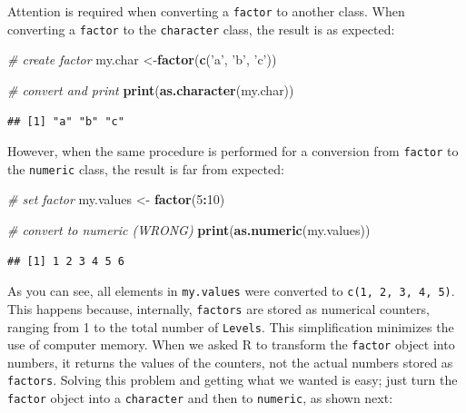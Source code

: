 \documentclass[11pt,]{book}
\newenvironment{Shaded}{\begin{snugshade}}{\end{snugshade}}
\newcommand{\KeywordTok}[1]{\textcolor[rgb]{0.27,0.27,0.27}{\textbf{#1}}}
\newcommand{\DecValTok}[1]{\textcolor[rgb]{0.06,0.06,0.06}{#1}}
\newcommand{\StringTok}[1]{\textcolor[rgb]{0.5,0.5,0.5}{#1}}
\newcommand{\CommentTok}[1]{\textcolor[rgb]{0.56,0.35,0.01}{\textit{#1}}}
\newcommand{\OperatorTok}[1]{\textcolor[rgb]{0.81,0.36,0.00}{\textbf{#1}}}
\newcommand{\NormalTok}[1]{#1}
\begin{document}
Attention is required when converting a \texttt{factor} to another
class. When converting a \texttt{factor} to the \texttt{character}
class, the result is as expected:

\begin{Shaded}
\begin{Highlighting}[]
\CommentTok{# create factor }
\NormalTok{my.char <-}\KeywordTok{factor}\NormalTok{(}\KeywordTok{c}\NormalTok{(}\StringTok{'a'}\NormalTok{, }\StringTok{'b'}\NormalTok{, }\StringTok{'c'}\NormalTok{))}

\CommentTok{# convert and print}
\KeywordTok{print}\NormalTok{(}\KeywordTok{as.character}\NormalTok{(my.char))}
\end{Highlighting}
\end{Shaded}

\begin{verbatim}
## [1] "a" "b" "c"
\end{verbatim}

However, when the same procedure is performed for a conversion from
\texttt{factor} to the \texttt{numeric} class, the result is far from
expected: 

\begin{Shaded}
\begin{Highlighting}[]
\CommentTok{# set factor}
\NormalTok{my.values <-}\StringTok{ }\KeywordTok{factor}\NormalTok{(}\DecValTok{5}\OperatorTok{:}\DecValTok{10}\NormalTok{)}

\CommentTok{# convert to numeric (WRONG)}
\KeywordTok{print}\NormalTok{(}\KeywordTok{as.numeric}\NormalTok{(my.values))}
\end{Highlighting}
\end{Shaded}

\begin{verbatim}
## [1] 1 2 3 4 5 6
\end{verbatim}

As you can see, all elements in \texttt{my.values} were converted to
\texttt{c(1,\ 2,\ 3,\ 4,\ 5)}. This happens because, internally,
\texttt{factors} are stored as numerical counters, ranging from 1 to the
total number of \texttt{Levels}. This simplification minimizes the use
of computer memory. When we asked R to transform the \texttt{factor}
object into numbers, it returns the values of the counters, not the
actual numbers stored as \texttt{factors}. Solving this problem and
getting what we wanted is easy; just turn the \texttt{factor} object
into a \texttt{character} and then to \texttt{numeric}, as shown next:
\end{document}
